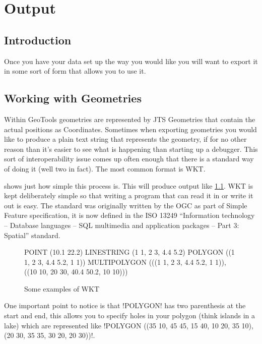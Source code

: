 \chapter{Output}

\section{Introduction}
Once you have your data set up the way you would like you will want 
to export it in some sort of form that allows you to use it.

\section{Working with Geometries}\label{geoms}
Within GeoTools geometries are represented by \ac{JTS} Geometries that contain the actual positions as Coordinates.
Sometimes when exporting geometries you would like to produce a plain text string that represents the geometry, if for no other reason than it's easier to see what is happening than starting up a debugger. 
This sort of interoperability issue comes up often enough that there is a standard way of doing it (well two in fact). The most common format is \ac{WKT}.



 shows just how simple this process is. This will produce output like \cref{wktoutput}. WKT is kept deliberately simple so that writing a program that can read it in or write it out is easy. The standard was originally written by the \ac{OGC} as part of Simple Feature specification, it is now defined in the ISO 13249 ``Information technology -- Database languages -- SQL multimedia and application packages -- Part 3: Spatial'' standard.

\begin{figure}[h]
\begin{spverbatim}
POINT (10.1 22.2) 
LINESTRING (1 1, 2 3, 4.4 5.2)
POLYGON ((1 1, 2 3, 4.4 5.2, 1 1))
MULTIPOLYGON (((1 1, 2 3, 4.4 5.2, 1 1)), 
    ((10 10, 20 30, 40.4 50.2, 10 10)))
\end{spverbatim}
\caption{Some examples of WKT}\label{wktoutput}
\end{figure}

One important point to notice is that \spverb!POLYGON! has two parenthesis at the start and end, this allows you to specify holes in your polygon (think islands in a lake) which are represented like \spverb!POLYGON ((35 10, 45 45, 15 40, 10 20, 35 10),(20 30, 35 35, 30 20, 20 30))!. 

